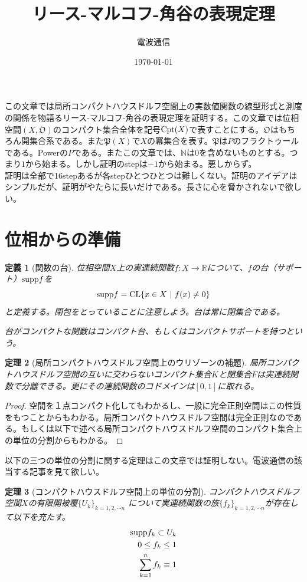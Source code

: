 \documentclass[leqno]{jsarticle}
\title{リース-マルコフ-角谷の表現定理}
\author{電波通信}
\date{\today}
\newtheorem{thm}{定理}
\newtheorem{df}[thm]{定義}
\newcommand{\nn}{\mathbb{N}}
\newcommand{\rr}{\mathbb{R}}
\newcommand{\supp}{\text{{\rm supp}}}
\newcommand{\pw}{\mathfrak{P}(X)}
\newcommand{\cpt}{{\rm Cpt}(X)}
\newcommand{\oo}{\mathfrak{O}}
\newcommand{\cl}{\text{{\rm CL}} }
\begin{document}
\maketitle
この文章では局所コンパクトハウスドルフ空間上の実数値関数の線型形式と測度の関係を物語るリース-マルコフ-角谷の表現定理を証明する。この文章では位相空間$(X,\oo)$のコンパクト集合全体を記号$\cpt$で表すことにする。$\oo$はもちろん開集合系である。また$\pw$で$X$の冪集合を表す。$\mathfrak{P}$は$P$のフラクトゥールである。Powerの$P$である。またこの文章では、$\nn$は$0$を含めないものとする。つまり$1$から始まる。しかし証明のstepは$-1$から始まる。悪しからず。\\ 
証明は全部で16stepあるが各stepひとつひとつは難しくない。証明のアイデアはシンプルだが、証明がやたらに長いだけである。長さに心を脅かされないで欲しい。
\setcounter{section}{-2}
\section{位相からの準備}
\begin{df}[関数の台]
位相空間$X$上の実連続関数$f:X\to \rr$について、$f$の台（サポート）$\supp f$を
\[
\supp f=\cl\{x\in X\ |\ f(x)\neq0\}
\]
と定義する。閉包をとっていることに注意しよう。台は常に閉集合である。\par
台がコンパクトな関数はコンパクト台、もしくはコンパクトサポートを持つという。
\end{df}
\begin{thm}[局所コンパクトハウスドルフ空間上のウリゾーンの補題]\label{urysohn}
局所コンパクトハウスドルフ空間の互いに交わらないコンパクト集合$K$と閉集合$F$は実連続関数で分離できる。更にその連続関数のコドメインは$[0,1]$に取れる。
\end{thm}
\begin{proof}
空間を１点コンパクト化してもわかるし、一般に完全正則空間はこの性質をもつことからもわかる。局所コンパクトハウスドルフ空間は完全正則なのである。もしくは以下で述べる局所コンパクトハウスドルフ空間のコンパクト集合上の単位の分割からもわかる。
\end{proof}

以下の三つの単位の分割に関する定理はこの文章では証明しない。電波通信の該当する記事を見て欲しい。
\begin{thm}[コンパクトハウスドルフ空間上の単位の分割]\label{pat}
コンパクトハウスドルフ空間$X$の有限開被覆$\{U_k\}_{k=1,2,\cdots n}$
について実連続関数の族$\{f_k\}_{k=1,2,\cdots n}$が存在して以下を充たす。
\begin{eqnarray*}
\supp f_k\subset U_k\\ 
0\le f_k \le1\\ 
\sum_{k=1}^{n}f_k\equiv 1
\end{eqnarray*}
\end{thm}
\end{document}
